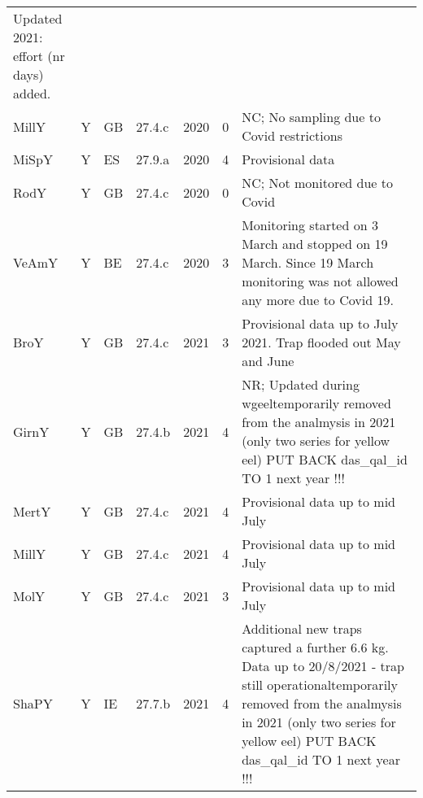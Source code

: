\begin{table}[htbp]
\begin{tabular}{p{1.5cm}p{1.5cm}p{1.5cm}p{1cm}p{1cm}p{1cm}p{8cm}}
 Updated 2021: effort (nr days) added. \\ 
  MillY & Y & GB & 27.4.c & 2020 &   0 & NC; No sampling due to Covid restrictions \\ 
  MiSpY & Y & ES & 27.9.a & 2020 &   4 & Provisional data \\ 
  RodY & Y & GB & 27.4.c & 2020 &   0 & NC; Not monitored due to Covid \\ 
  VeAmY & Y & BE & 27.4.c & 2020 &   3 & Monitoring started on 3 March and stopped on 19 March. Since 19 March monitoring was not allowed any more due to Covid 19. \\ 
  BroY & Y & GB & 27.4.c & 2021 &   3 & Provisional data up to July 2021. Trap flooded out May and June \\ 
  GirnY & Y & GB & 27.4.b & 2021 &   4 & NR; Updated during wgeeltemporarily removed from the analmysis in 2021 (only two series for yellow eel) PUT BACK das\_qal\_id TO 1 next year !!! \\ 
  MertY & Y & GB & 27.4.c & 2021 &   4 & Provisional data up to mid July \\ 
  MillY & Y & GB & 27.4.c & 2021 &   4 & Provisional data up to mid July \\ 
  MolY & Y & GB & 27.4.c & 2021 &   3 & Provisional data up to mid July \\ 
  ShaPY & Y & IE & 27.7.b & 2021 &   4 & Additional new traps captured a further 6.6 kg. Data up to 20/8/2021 - trap still operationaltemporarily removed from the analmysis in 2021 (only two series for yellow eel) PUT BACK das\_qal\_id TO 1 next year !!! \\ 
   \hline
\end{tabular}
\end{table}
